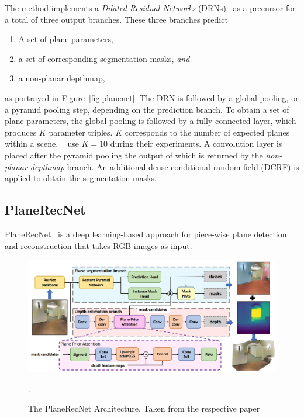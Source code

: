 \documentclass[main.tex]{subfiles}
\begin{document}
The method implements a \textit{Dilated Residual Networks} (DRNs)~\cite{yu2017dilated} as a precursor for a total of three output branches.
These three branches predict
\begin{enumerate}
    \item A set of plane parameters,
    \item a set of corresponding segmentation masks, \textit{and}
    \item a non-planar depthmap,
\end{enumerate}
as portrayed in Figure~\ref{fig:planenet}. The DRN is followed by a global pooling, or a pyramid pooling step, depending on the prediction branch.
To obtain a set of plane parameters, the global pooling is followed by a fully connected layer, which produces $K$ parameter triples. $K$ corresponds to the number of
expected planes within a scene. \citeauthor{Liu_Yang_Ceylan_Yumer_Furukawa_2018}~\cite{Liu_Yang_Ceylan_Yumer_Furukawa_2018} use $K=10$ during their experiments.
A convolution layer is placed after the pyramid pooling the output of which is returned by the \textit{non-planar depthmap} branch.
An additional dense conditional random field (DCRF) is applied to obtain the segmentation masks.

\subsection{PlaneRecNet}
\label{subsec:bg-planerecnet}
PlaneRecNet~\cite{Xie_Shu_Rambach_Pagani_Stricker_2022} is a deep learning-based approach for piece-wise plane detection and reconstruction that takes RGB images
as input.
\begin{figure}[H]
    \centering
    \includegraphics[width=\textwidth]{images/planerecnet.png}
    \caption[PlaneRecNet Architecture]{The PlaneRecNet Architecture. Taken from the respective paper~\cite[Figure~1]{Xie_Shu_Rambach_Pagani_Stricker_2022}}.
    \label{fig:planerecnet}
\end{figure}
\end{document}

